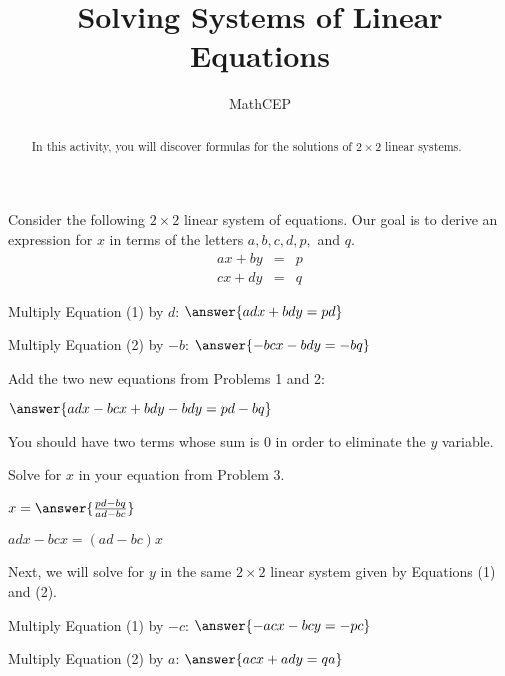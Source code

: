\documentclass[number]{ximera}
\title{Solving Systems of Linear Equations}
\author{MathCEP}
\begin{document}
\begin{abstract}
  In this activity, you will discover formulas for the solutions of $2\times2$ linear systems.
\end{abstract}

\maketitle

Consider the following $2\times2$ linear system of equations. Our goal is to derive an expression for $x$ in terms of the letters $a,b,c,d,p,$ and $q$.
\begin{eqnarray}
ax+by&=&p\\
cx+dy&=&q
\end{eqnarray}

\begin{problem}
Multiply Equation (1) by $d$: $\answer{adx+bdy=pd}$
\end{problem}

\begin{problem}
Multiply Equation (2) by $-b$: $\answer{-bcx-bdy=-bq}$
\end{problem}

\begin{problem}
Add the two new equations from Problems 1 and 2:

$\answer{adx-bcx+ bdy-bdy =pd-bq}$
\begin{hint} You should have two terms whose sum is $0$ in order to eliminate the $y$ variable.  \end{hint}
\end{problem}

\begin{problem}
Solve for $x$ in your equation from Problem 3.

$x=\answer{\frac{pd-bq}{ad-bc}}$

\begin{hint} $adx-bcx=(ad-bc)x$ \end{hint}
\end{problem}

Next, we will solve for $y$ in the same $2\times2$ linear system given by Equations (1) and (2).

\begin{problem}
Multiply Equation (1) by $-c$: $\answer{-acx-bcy=-pc}$
\end{problem}

\begin{problem}
Multiply Equation (2) by $a$: $\answer{acx+ady=qa}$
\end{problem}
\end{document}
